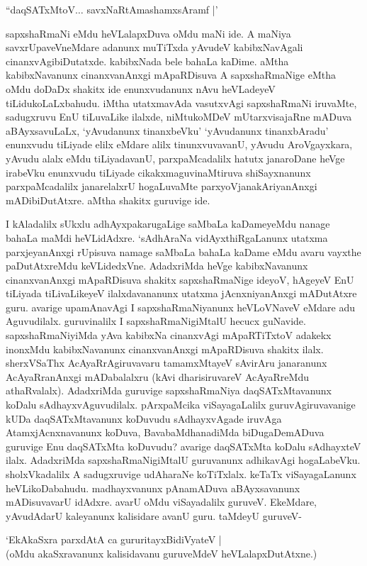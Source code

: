 \begin{shloka}
``daqSATxMtoV$\ldots$ savxNaRtAmashamxsAramf |'
\end{shloka}

sapxshaRmaNi eMdu heVLalapxDuva oMdu maNi ide. A maNiya savxrUpaveVneMdare adanunx muTiTxda yAvudeV kabibxNavAgali cinanxvAgibiDutatxde. kabibxNada bele bahaLa kaDime. aMtha kabibxNavanunx cinanxvanAnxgi mApaRDisuva A sapxshaRmaNige eMtha oMdu doDaDx shakitx ide enunxvudanunx nAvu heVLadeyeV tiLidukoLaLxbahudu. iMtha utatxmavAda vasutxvAgi sapxshaRmaNi iruvaMte, sadugxruvu EnU tiLuvaLike ilalxde, niMtukoMDeV mUtarxvisajaRne mADuva aBAyxsavuLaLx, `yAvudanunx tinanxbeVku' `yAvudanunx tinanxbAradu' enunxvudu tiLiyade elilx eMdare alilx tinunxvuvavanU, yAvudu AroVgayxkara, yAvudu alalx eMdu tiLiyadavanU, parxpaMcadalilx hatutx janaroDane heVge irabeVku enunxvudu tiLiyade cikakxmaguvinaMtiruva shiSayxnanunx parxpaMcadalilx janarelalxrU hogaLuvaMte parxyoVjanakAriyanAnxgi mADibiDutAtxre. aMtha shakitx guruvige ide.

I kAladalilx sUkxlu adhAyxpakarugaLige saMbaLa kaDameyeMdu nanage bahaLa maMdi heVLidAdxre. `sAdhAraNa vidAyxthiRgaLanunx utatxma parxjeyanAnxgi rUpisuva namage saMbaLa bahaLa kaDame eMdu avaru vayxthe paDutAtxreMdu keVLidedxVne. AdadxriMda heVge kabibxNavanunx cinanxvanAnxgi mApaRDisuva shakitx sapxshaRmaNige ideyoV, hAgeyeV EnU tiLiyada tiLivaLikeyeV ilalxdavananunx utatxma jAcnxniyanAnxgi mADutAtxre guru. avarige upamAnavAgi I sapxshaRmaNiyanunx heVLoVNaveV eMdare adu Aguvudilalx. guruvinalilx I sapxshaRmaNigiMtalU hecucx guNavide. sapxshaRmaNiyiMda yAva kabibxNa cinanxvAgi mApaRTiTxtoV adakekx inonxMdu kabibxNavanunx cinanxvanAnxgi mApaRDisuva shakitx ilalx. sherxVSaThx AcAyaRrAgiruvavaru tamamxMtayeV sAvirAru janaranunx AcAyaRranAnxgi mADabalalxru (kAvi dharisiruvareV AcAyaRreMdu athaRvalalx). AdadxriMda guruvige sapxshaRmaNiya daqSATxMtavanunx koDalu sAdhayxvAguvudilalx. pArxpaMcika viSayagaLalilx guruvAgiruvavanige kUDa daqSATxMtavanunx koDuvudu sAdhayxvAgade iruvAga AtamxjAcnxnavanunx koDuva, BavabaMdhanadiMda biDugaDemADuva guruvige Enu daqSATxMta koDuvudu? avarige daqSATxMta koDalu sAdhayxteV ilalx. AdadxriMda sapxshaRmaNigiMtalU guruvanunx adhikavAgi hogaLabeVku. sholxVkadalilx A sadugxruvige udAharaNe koTiTxlalx. keTaTx viSayagaLanunx heVLikoDabahudu. madhayxvanunx pAnamADuva aBAyxsavanunx mADisuvavarU idAdxre. avarU oMdu viSayadalilx guruveV. EkeMdare, yAvudAdarU kaleyanunx kalisidare avanU guru. taMdeyU guruveV-

\begin{shloka}
`EkAkaSxra parxdAtA ca gururitayxBidiVyateV |\\
(oMdu akaSxravanunx kalisidavanu guruveMdeV heVLalapxDutAtxne.)
\end{shloka} 

